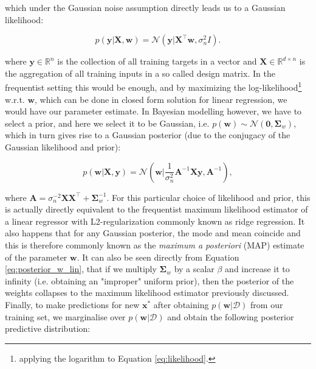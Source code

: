 \noindent which under the Gaussian noise assumption directly leads us to a Gaussian likelihood:

\begin{equation}
    p(\mathbf{y}|\mathbf{X}, \mathbf{w}) =\mathcal{N}(\mathbf{y}|\mathbf{X}^\top\mathbf{w},\sigma_n^2I).
    \label{eq:likelihood}
\end{equation}


\noindent where $\mathbf{y} \in \mathbb{R}^n$ is the collection of all training targets in a vector and $\mathbf{X}\in \mathbb{R}^{d\times n}$ is the aggregation of all training inputs in a so called design matrix. In the frequentist setting this would be enough, and by maximizing the log-likelihood\footnote{applying the logarithm to Equation \ref{eq:likelihood}.} w.r.t. $\mathbf{w}$, which can be done in closed form solution for linear regression, we would have our parameter estimate. In Bayesian modelling however, we have to select a prior, and here we select it to be Gaussian, i.e. $p(\mathbf{w})\sim \mathcal{N}(\mathbf{0}, \bm\Sigma_w)$, which in turn gives rise to a Gaussian posterior (due to the conjugacy of the Gaussian likelihood and prior):

\begin{equation}
    p(\mathbf{w}|\mathbf{X},\mathbf{y}) = \mathcal{N}(\mathbf{w}\big|\frac{1}{\sigma_n^2}\mathbf{A}^{-1}\mathbf{X}\mathbf{y}, \mathbf{A}^{-1}),
    \label{eq:posterior_w_lin}
\end{equation}

\noindent where $\mathbf{A} = \sigma_n^{-2}\mathbf{X}\mathbf{X}^\top + \bm\Sigma_w^{-1}$. For this particular choice of likelihood and prior, this is actually directly equivalent to the frequentist maximum likelihood estimator of a linear regressor with L2-regularization commonly known as ridge regression. It also happens that for any Gaussian posterior, the mode and mean coincide and this is therefore commonly known as the \textit{maximum a posteriori} (MAP) estimate of the parameter $\mathbf{w}$. It can also be seen directly from Equation \ref{eq:posterior_w_lin}, that if we multiply $\bm\Sigma_{w}$ by a scalar $\beta$ and increase it to infinity (i.e. obtaining an "improper" uniform prior), then the posterior of the weights collapses to the maximum likelihood estimator previously discussed. Finally, to make predictions for new $\mathbf{x^*}$ after obtaining $p(\mathbf{w}|\mathcal{D})$ from our training set, we marginalise over $p(\mathbf{w}|\mathcal{D})$ and obtain the following posterior predictive distribution:

